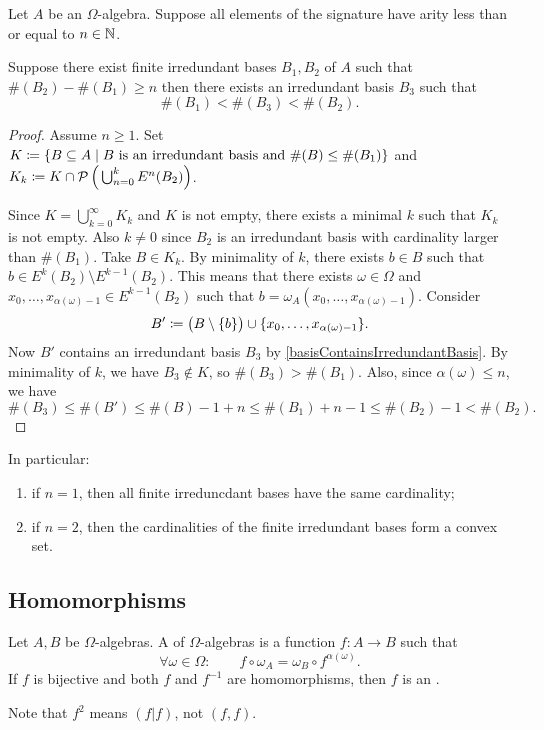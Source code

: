 \begin{proposition}
Let $A$ be an $\Omega$-algebra. Suppose all elements of the signature have arity less than or equal to $n\in \mathbb{N}$.

Suppose there exist finite irredundant bases $B_1, B_2$ of $A$ such that $\#(B_2) - \#(B_1)\geq n$
then there exists an irredundant basis $B_3$ such that
\[ \#(B_1) < \#(B_3) < \#(B_2). \]
\end{proposition}
\begin{proof}
Assume $n \geq 1$. Set $K \defeq \setbuilder{B\subseteq A}{\text{$B$ is an irredundant basis and $\#(B)\leq \#(B_1)$}}$ and $K_k \coloneqq K \cap \operatorname{\mathcal{P}}\Big(\bigcup_{n=0}^k E^n(B_2)\Big)$.

Since $K = \bigcup_{k=0}^\infty K_k$ and $K$ is not empty, there exists a minimal $k$ such that $K_k$ is not empty. Also $k\neq 0$ since $B_2$ is an irredundant basis with cardinality larger than $\#(B_1)$. Take $B\in K_k$. By minimality of $k$, there exists $b\in B$ such that $b\in E^k(B_2)\setminus E^{k-1}(B_2)$. This means that there exists $\omega\in \Omega$ and $x_0,\ldots , x_{\alpha(\omega)-1}\in E^{k-1}(B_2)$ such that $b = \omega_A(x_0,\ldots , x_{\alpha(\omega)-1})$.
Consider
\[ B' \coloneqq \big(B\setminus \{b\}\big) \cup \{x_0,\ldots , x_{\alpha(\omega)-1}\}. \]
Now $B'$ contains an irredundant basis $B_3$ by \ref{basisContainsIrredundantBasis}. By minimality of $k$, we have $B_3\notin K$, so $\#(B_3) > \#(B_1)$.
Also, since $\alpha(\omega) \leq n$, we have
\[ \#(B_3) \leq \#(B') \leq \#(B)-1+n \leq \#(B_1) + n -1 \leq \#(B_2) -1 < \#(B_2). \]
\end{proof}
\begin{corollary}
In particular:
\begin{enumerate}
\item if $n=1$, then all finite irreduncdant bases have the same cardinality;
\item if $n=2$, then the cardinalities of the finite irredundant bases form a convex set.
\end{enumerate}
\end{corollary}

\subsection{Homomorphisms}
\begin{definition}
Let $A,B$ be $\Omega$-algebras. A  of $\Omega$-algebras is a function $f:A\to B$ such that
\[ \forall \omega\in\Omega: \qquad f\circ \omega_A = \omega_B\circ f^{\alpha(\omega)}. \]
If $f$ is bijective and both $f$ and $f^{-1}$ are homomorphisms, then $f$ is an .
\end{definition}
Note that $f^{2}$ means $(f|f)$, not $(f,f)$.


